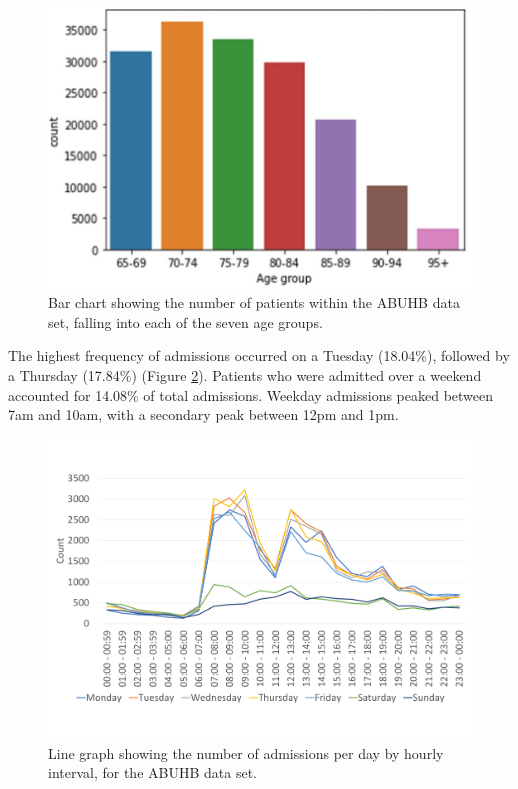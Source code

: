 \documentclass[../thesis.tex]{subfiles}
\begin{document}
\begin{figure}[h!]
    \centering
    \includegraphics[scale=0.6]{Chapters/Chapter5/Figures/Age group.pdf}
    \caption{Bar chart showing the number of patients within the ABUHB data set, falling into each of the seven age groups.}
    \label{fig:AgeGroup}
\end{figure}

The highest frequency of admissions occurred on a Tuesday (18.04\%), followed by a Thursday (17.84\%) (Figure \ref{fig:AdmissionTimes}). Patients who were admitted over a weekend accounted for 14.08\% of total admissions. Weekday admissions peaked between 7am and 10am, with a secondary peak between 12pm and 1pm.

\begin{figure}[h!]
    \centering
    \includegraphics[width=\textwidth]{Chapters/Chapter5/Figures/AdmissionTimes.pdf}
    \caption{Line graph showing the number of admissions per day by hourly interval, for the ABUHB data set.}
    \label{fig:AdmissionTimes}
\end{figure}
\end{document}
